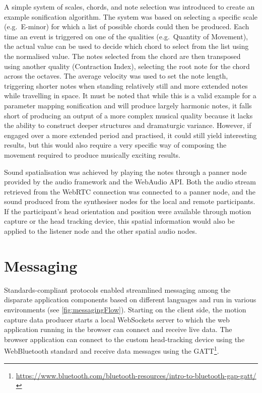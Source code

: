 A simple system of scales, chords, and note selection was introduced to create an example sonification algorithm.
The system was based on selecting a specific scale (e.g.\ E-minor) for which a list of possible chords could then be produced.
Each time an event is triggered on one of the qualities (e.g.\ Quantity of Movement), the actual value can be used to decide which chord to select from the list using the normalised value.
The notes selected from the chord are then transposed using another quality (Contraction Index), selecting the root note for the chord across the octaves.
The average velocity was used to set the note length, triggering shorter notes when standing relatively still and more extended notes while travelling in space.
It must be noted that while this is a valid example for a parameter mapping sonification and will produce largely harmonic notes, it falls short of producing an output of a more complex musical quality because it lacks the ability to construct deeper structures and dramaturgic variance.
However, if engaged over a more extended period and practised, it could still yield interesting results, but this would also require a very specific way of composing the movement required to produce musically exciting results.

Sound spatialisation was achieved by playing the notes through a panner node provided by the audio framework and the WebAudio \ac{API}.
Both the audio stream retrieved from the \ac{WebRTC} connection was connected to a panner node, and the sound produced from the synthesiser nodes for the local and remote participants.
If the participant's head orientation and position were available through motion capture or the head tracking device, this spatial information would also be applied to the listener node and the other spatial audio nodes.

\section{Messaging}
\label{sec:messaging}

Standards-compliant protocols enabled streamlined messaging among the disparate application components based on different languages and run in various environments (see \autoref{fig:messagingFlow}).
Starting on the client side, the motion capture data producer starts a local WebSockets server to which the web application running in the browser can connect and receive live data.
The browser application can connect to the custom head-tracking device using the WebBluetooth standard and receive data messages using the \ac{GATT}\footnote{\url{https://www.bluetooth.com/bluetooth-resources/intro-to-bluetooth-gap-gatt/}}.

